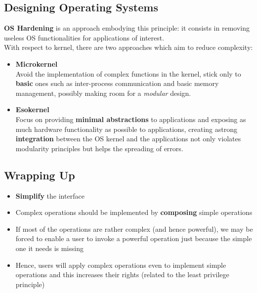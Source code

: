 \subsection{Designing Operating Systems}
\textbf{OS Hardening} is an approach embodying this principle:
it consists in removing useless OS functionalities for applications
of interest.\\
With respect to kernel, there are two approaches which aim to reduce complexity:
\begin{itemize}
   \item \textbf{Microkernel}\\
   Avoid the implementation of complex functions in the kernel,
   stick only to \textbf{basic} ones such as inter-process communication and basic memory management,
   possibly making room for a \textit{modular} design.
   \item \textbf{Esokernel}\\
   Focus on providing \textbf{minimal abstractions} to applications and exposing as much hardware functionality as possible to applications,
   creating astrong \textbf{integration} between the OS kernel and the
   applications not only violates modularity principles
   but helps the spreading of errors.
\end{itemize}

\subsection{Wrapping Up}
\begin{itemize}
   \color{darkgreen}
   \item \textbf{Simplify} the interface
   \item Complex operations should be implemented by \textbf{composing}
   simple operations

\end{itemize}
\begin{itemize}
   \color{darkred}
   \item If most of the operations are rather complex (and hence
   powerful), we may be forced to enable a user to invoke a
   powerful operation just because the simple one it needs is
   missing
   \item Hence, users will apply complex operations even to
   implement simple operations and this increases their rights
   (related to the least privilege principle)
\end{itemize}

